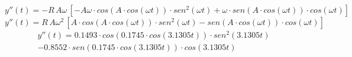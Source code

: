 \documentclass[letter,11pt]{article}
\begin{document}
\begin{equation*}
    y''(t) = -R\, A \omega\, [ -A \omega \cdot cos(A \cdot cos(\omega t)) \cdot sen^2(\omega t) + \omega \cdot sen(A \cdot cos(\omega t)) \cdot cos(\omega t)]
\end{equation*}
\begin{equation*}
    y''(t) = R\, A \omega^2\, [A \cdot cos(A \cdot cos(\omega t)) \cdot sen^2(\omega t) - sen(A \cdot cos(\omega t)) \cdot cos(\omega t)]
\end{equation*}
\begin{equation}
    \begin{split}
        y''(t) = 0.1493 \cdot cos(0.1745 \cdot cos(3.1305 t)) \cdot sen^2(3.1305 t) \\
                 -0.8552 \cdot sen(0.1745 \cdot cos(3.1305t)) \cdot cos(3.1305t)
    \end{split}
\end{equation}
\end{document}
